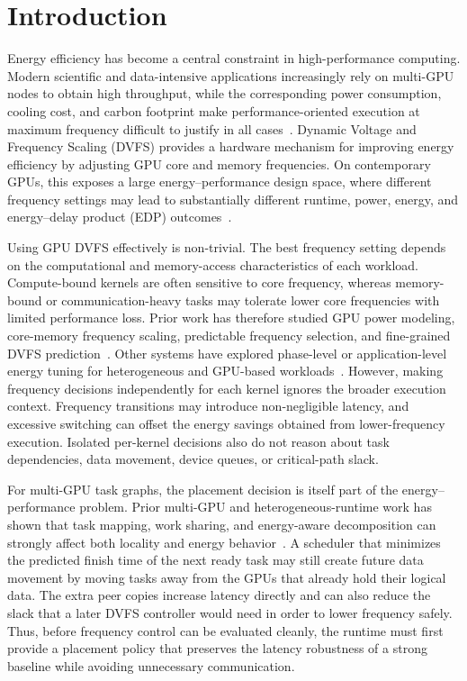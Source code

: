\chapter{Introduction}

Energy efficiency has become a central constraint in high-performance computing. Modern scientific and data-intensive applications increasingly rely on multi-GPU nodes to obtain high throughput, while the corresponding power consumption, cooling cost, and carbon footprint make performance-oriented execution at maximum frequency difficult to justify in all cases~\cite{Masanet2020DataCenter}. Dynamic Voltage and Frequency Scaling (DVFS) provides a hardware mechanism for improving energy efficiency by adjusting GPU core and memory frequencies. On contemporary GPUs, this exposes a large energy--performance design space, where different frequency settings may lead to substantially different runtime, power, energy, and energy--delay product (EDP) outcomes~\cite{Mei2017Survey,Ali2022Optimal,Ali2023Portable,Wang2024DSO}.

Using GPU DVFS effectively is non-trivial. The best frequency setting depends on the computational and memory-access characteristics of each workload. Compute-bound kernels are often sensitive to core frequency, whereas memory-bound or communication-heavy tasks may tolerate lower core frequencies with limited performance loss. Prior work has therefore studied GPU power modeling, core-memory frequency scaling, predictable frequency selection, and fine-grained DVFS prediction~\cite{Guerreiro2018PowerModeling,Guerreiro2019CrossDomain,Wang2020FreqScaling,Fan2019Predictable,Bharadwaj2023Predict}. Other systems have explored phase-level or application-level energy tuning for heterogeneous and GPU-based workloads~\cite{Fan2023Synergy,Carpentieri2025Phase,Wang2024DSO}. However, making frequency decisions independently for each kernel ignores the broader execution context. Frequency transitions may introduce non-negligible latency, and excessive switching can offset the energy savings obtained from lower-frequency execution. Isolated per-kernel decisions also do not reason about task dependencies, data movement, device queues, or critical-path slack.

For multi-GPU task graphs, the placement decision is itself part of the energy--performance problem. Prior multi-GPU and heterogeneous-runtime work has shown that task mapping, work sharing, and energy-aware decomposition can strongly affect both locality and energy behavior~\cite{Zamani2023GreenMD,Chen2022CASE,John2024WorkSharing}. A scheduler that minimizes the predicted finish time of the next ready task may still create future data movement by moving tasks away from the GPUs that already hold their logical data. The extra peer copies increase latency directly and can also reduce the slack that a later DVFS controller would need in order to lower frequency safely. Thus, before frequency control can be evaluated cleanly, the runtime must first provide a placement policy that preserves the latency robustness of a strong baseline while avoiding unnecessary communication.

